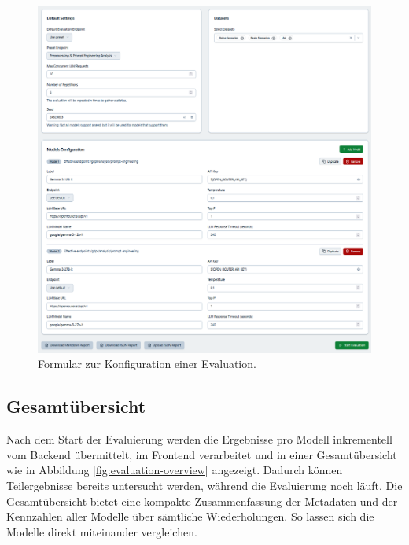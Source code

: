 \begin{figure}[h]
    \centering
    \includegraphics[width=\textwidth]{images/evaluation/evaluation-config_new}
    \caption{Formular zur Konfiguration einer Evaluation.}
    \label{fig:evaluation-config}
\end{figure}

\subsection*{Gesamtübersicht}

Nach dem Start der Evaluierung werden die Ergebnisse pro Modell inkrementell vom Backend übermittelt, im Frontend verarbeitet und in einer Gesamtübersicht wie in Abbildung \ref{fig:evaluation-overview} angezeigt. Dadurch können Teilergebnisse bereits untersucht werden, während die Evaluierung noch läuft. Die Gesamtübersicht bietet eine kompakte Zusammenfassung der Metadaten und der Kennzahlen aller Modelle über sämtliche Wiederholungen. So lassen sich die Modelle direkt miteinander vergleichen.

